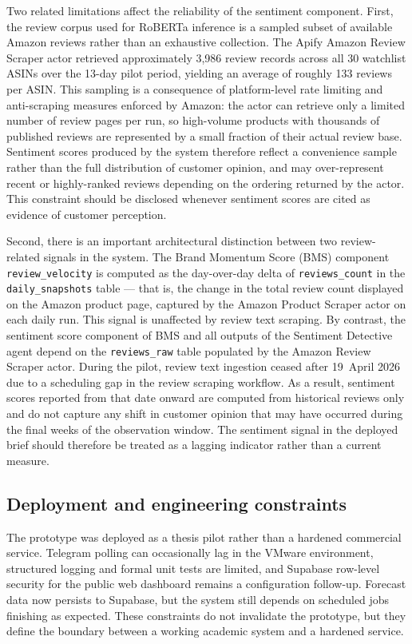 Two related limitations affect the reliability of the sentiment component. First, the review corpus used for RoBERTa inference is a sampled subset of available Amazon reviews rather than an exhaustive collection. The Apify Amazon Review Scraper actor retrieved approximately 3,986 review records across all 30 watchlist ASINs over the 13-day pilot period, yielding an average of roughly 133 reviews per ASIN. This sampling is a consequence of platform-level rate limiting and anti-scraping measures enforced by Amazon: the actor can retrieve only a limited number of review pages per run, so high-volume products with thousands of published reviews are represented by a small fraction of their actual review base. Sentiment scores produced by the system therefore reflect a convenience sample rather than the full distribution of customer opinion, and may over-represent recent or highly-ranked reviews depending on the ordering returned by the actor. This constraint should be disclosed whenever sentiment scores are cited as evidence of customer perception.

Second, there is an important architectural distinction between two review-related signals in the system. The Brand Momentum Score (BMS) component \texttt{review\_velocity} is computed as the day-over-day delta of \texttt{reviews\_count} in the \texttt{daily\_snapshots} table --- that is, the change in the total review count displayed on the Amazon product page, captured by the Amazon Product Scraper actor on each daily run. This signal is unaffected by review text scraping. By contrast, the sentiment score component of BMS and all outputs of the Sentiment Detective agent depend on the \texttt{reviews\_raw} table populated by the Amazon Review Scraper actor. During the pilot, review text ingestion ceased after 19~April 2026 due to a scheduling gap in the review scraping workflow. As a result, sentiment scores reported from that date onward are computed from historical reviews only and do not capture any shift in customer opinion that may have occurred during the final weeks of the observation window. The sentiment signal in the deployed brief should therefore be treated as a lagging indicator rather than a current measure.

\subsection{Deployment and engineering constraints}

The prototype was deployed as a thesis pilot rather than a hardened commercial service. Telegram polling can occasionally lag in the VMware environment, structured logging and formal unit tests are limited, and Supabase row-level security for the public web dashboard remains a configuration follow-up. Forecast data now persists to Supabase, but the system still depends on scheduled jobs finishing as expected. These constraints do not invalidate the prototype, but they define the boundary between a working academic system and a hardened service.

